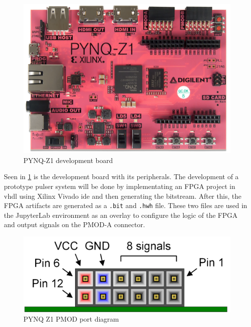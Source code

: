 \begin{figure}[htbp]
	\centering
	\includegraphics[width=.8\textwidth]{Figures/4_pynq_z1_pcb_pic.png}
	\caption{PYNQ-Z1 development board}
	\label{fig:4_controlsystem_pynq_z1_pcb}
\end{figure}

Seen in \cref{fig:4_controlsystem_pynq_z1_pcb} is the development board with its peripherals. The development of a prototype pulser system will be done by implementating an FPGA project in \gls{vhdl} using Xilinx Vivado \gls{ide} and then generating the \gls{bitstream}. After this, the FPGA artifacts are generated as a \texttt{.bit} and \texttt{.hwh} file. These two files are used in the JupyterLab environment as an overlay to configure the logic of the FPGA and output signals on the PMOD-A connector.

\begin{figure}[htbp]
	\centering
	\includegraphics[width=.8\textwidth]{Figures/4_pynq-z1-pmod.pdf}
	\caption[PYNQ Z1 PMOD port diagram]{PYNQ Z1 PMOD port diagram \cite{pynqrm}}
	\label{fig:4_controlsystem_pynq_z1_pmod}
\end{figure}

